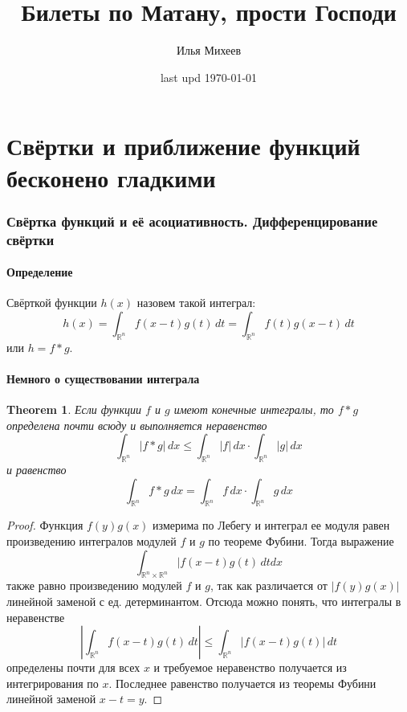 \documentclass[a4paper,12pt]{article} %
\author{Илья Михеев}
\title{Билеты по Матану, прости Господи}
\date{last upd \today  }
\newtheorem{theorem}{Theorem}
\theoremstyle{definition}
\begin{document}
	
\maketitle 
	
\part{Свёртки и приближение функций бесконено гладкими}
\section{Свёртка функций и её асоциативность. Дифференцирование свёртки}
\subsection{Определение}
Свёрткой функции $h(x)$ назовем такой интеграл:
\begin{equation}
	h(x) = \int_{\mathbb{R}^n} f(x - t) g(t) \, dt = \int_{\mathbb{R}^n} f(t) g(x - t) \, dt 
\end{equation}
или $h= f * g$. 
\subsection{Немного о существовании интеграла}
\begin{theorem}\label{th1} 
	Если функции $f$ и $g$ имеют конечные интегралы, то $f *g$ определена почти всюду и выполняется неравенство
	\begin{equation}
		 \int_{\mathbb{R}^n} |f * g| \, dx  \leq  \int_{\mathbb{R}^n} |f| \, dx  \cdot  \int_{\mathbb{R}^n} |g|\, dx 
	\end{equation}
	и равенство
	\begin{equation}
		 \int_{\mathbb{R}^n} f  * g \, dx  =  \int_{\mathbb{R}^n} f \, dx \cdot  \int_{\mathbb{R}^n} g \, dx 
	\end{equation}
\end{theorem}
\begin{proof}
	Функция $f(y)g(x)$ измерима по Лебегу и интеграл ее модуля равен произведению интегралов модулей $f$ и $g$ по теореме Фубини. Тогда выражение 
	\begin{equation}
		 \int_{\mathbb{R}^n \times \mathbb{R}^n} |f(x - t) g(t) \, dt dx
	\end{equation}
	также равно произведению модулей $f$ и $g$, так как различается от $|f(y) g(x)|$ линейной заменой с ед. детерминантом. Отсюда можно понять, что интегралы в неравенстве
	\begin{equation}
		\left| \int_{\mathbb{R}^n} f(x - t) g(t) \, dt \right| \leq  \int_{\mathbb{R}^n} |f(x - t) g(t)| \, dt 
	\end{equation}
	определены почти для всех $x$ и требуемое неравенство получается из интегрирования по $x$. Последнее равенство получается из теоремы Фубини линейной заменой $x - t  = y$.
\end{proof}
\end{document}

